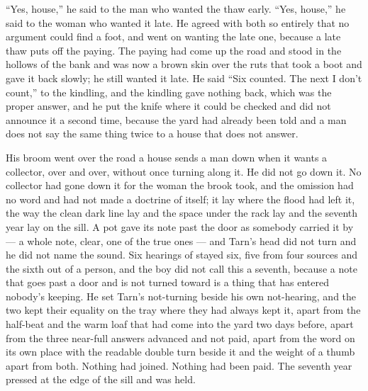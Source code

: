 “Yes, house,” he said to the man who wanted the thaw early. “Yes, house,” he said to the woman who wanted it late. He agreed with both so entirely that no argument could find a foot, and went on wanting the late one, because a late thaw puts off the paying. The paying had come up the road and stood in the hollows of the bank and was now a brown skin over the ruts that took a boot and gave it back slowly; he still wanted it late. He said “Six counted. The next I don't count,” to the kindling, and the kindling gave nothing back, which was the proper answer, and he put the knife where it could be checked and did not announce it a second time, because the yard had already been told and a man does not say the same thing twice to a house that does not answer.

His broom went over the road a house sends a man down when it wants a collector, over and over, without once turning along it. He did not go down it. No collector had gone down it for the woman the brook took, and the omission had no word and had not made a doctrine of itself; it lay where the flood had left it, the way the clean dark line lay and the space under the rack lay and the seventh year lay on the sill. A pot gave its note past the door as somebody carried it by --- a whole note, clear, one of the true ones --- and Tarn's head did not turn and he did not name the sound. Six hearings of  stayed six, five from four sources and the sixth out of a person, and the boy did not call this a seventh, because a note that goes past a door and is not turned toward is a thing that has entered nobody's keeping. He set Tarn's not-turning beside his own not-hearing, and the two kept their equality on the tray where they had always kept it, apart from the half-beat and the warm loaf that had come into the yard two days before, apart from the three near-full answers advanced and not paid, apart from the word on its own place with the readable double turn beside it and the weight of a thumb apart from both. Nothing had joined. Nothing had been paid. The seventh year pressed at the edge of the sill and was held.

